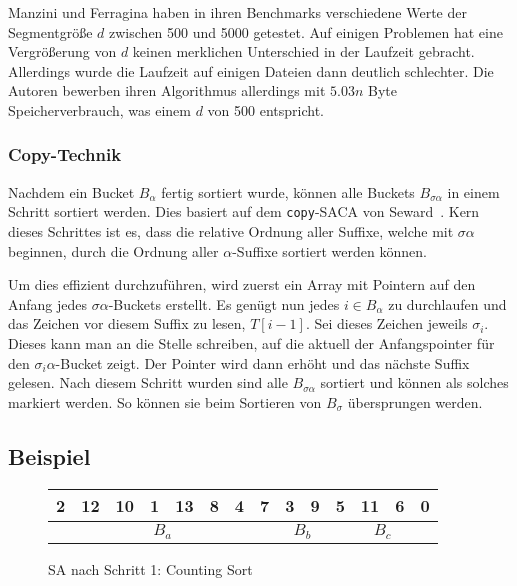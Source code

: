 Manzini und Ferragina haben in ihren Benchmarks verschiedene Werte der Segmentgröße $d$ zwischen 500 und 5000 getestet.
Auf einigen Problemen hat eine Vergrößerung von $d$ keinen merklichen Unterschied in der Laufzeit gebracht.
Allerdings wurde die Laufzeit auf einigen Dateien dann deutlich schlechter.
Die Autoren bewerben ihren Algorithmus allerdings mit $5.03n$ Byte Speicherverbrauch, was einem $d$ von 500 entspricht.

\subsubsection{Copy-Technik}

Nachdem ein Bucket $B_\alpha$ fertig sortiert wurde, können alle Buckets $B_{\sigma\alpha}$ in einem Schritt sortiert werden.
Dies basiert auf dem \texttt{copy}-SACA von Seward~\cite{seward2000}.
Kern dieses Schrittes ist es, dass die relative Ordnung aller Suffixe,
welche mit $\sigma\alpha$ beginnen, durch die Ordnung aller $\alpha$-Suffixe sortiert werden können.

Um dies effizient durchzuführen, wird zuerst ein Array mit Pointern auf den Anfang jedes $\sigma\alpha$-Buckets erstellt.
Es genügt nun jedes $i \in B_\alpha$ zu durchlaufen und das Zeichen vor diesem Suffix zu lesen, $T[i - 1]$.
Sei dieses Zeichen jeweils $\sigma_i$.
Dieses kann man an die Stelle schreiben, auf die aktuell der Anfangspointer für den $\sigma_i\alpha$-Bucket zeigt.
Der Pointer wird dann erhöht und das nächste Suffix gelesen.
Nach diesem Schritt wurden sind alle $B_{\sigma\alpha}$ sortiert und können als solches markiert werden.
So können sie beim Sortieren von $B_\sigma$ übersprungen werden.

\subsection{Beispiel}

\begin{figure}[!h]
\centering
\begin{tabular}{|c|c|c|c|c|c|c|c|c|c|c|c|c|c|}
\hline
2 & 12 & 10 & 1 & 13 & 8 & 4 & 7 & 3 & 9 & 5 & 11 & 6 & 0 \\
\hline
\multicolumn{8}{|c|}{$B_a$} & \multicolumn{2}{c|}{$B_b$} & \multicolumn{4}{c|}{$B_c$} \\
\hline
\end{tabular}
\caption{SA nach Schritt 1: Counting Sort}
\label{ds:beispiel1}
\end{figure}


